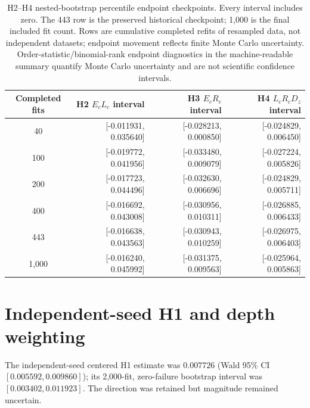 \documentclass[pdflatex,sn-basic,Numbered]{sn-jnl}
\begin{document}
\begin{table}[t]\centering\small
\begin{tabular}{crrr}
\toprule
Completed fits & H2 $E_cL_c$ interval & H3 $E_cR_c$ interval & H4 $L_cR_cD_z$ interval \\
\midrule
40    & [-0.011931, 0.035640] & [-0.028213, 0.000850] & [-0.024829, 0.006450] \\
100   & [-0.019772, 0.041956] & [-0.033480, 0.009079] & [-0.027224, 0.005826] \\
200   & [-0.017723, 0.044496] & [-0.032630, 0.006696] & [-0.024829, 0.005711] \\
400   & [-0.016692, 0.043008] & [-0.030956, 0.010311] & [-0.026885, 0.006433] \\
443   & [-0.016638, 0.043563] & [-0.030943, 0.010259] & [-0.026975, 0.006403] \\
1,000 & [-0.016240, 0.045992] & [-0.031375, 0.009563] & [-0.025964, 0.005863] \\
\bottomrule
\end{tabular}
\caption{H2--H4 nested-bootstrap percentile endpoint checkpoints. Every interval includes zero. The 443 row is the preserved historical checkpoint; 1,000 is the final included fit count. Rows are cumulative completed refits of resampled data, not independent datasets; endpoint movement reflects finite Monte Carlo uncertainty. Order-statistic/binomial-rank endpoint diagnostics in the machine-readable summary quantify Monte Carlo uncertainty and are not scientific confidence intervals.}
\label{supp:tab:bootstrap-checkpoints}
\end{table}

\section{Independent-seed H1 and depth weighting}

The independent-seed centered H1 estimate was $0.007726$ (Wald 95\% CI $[0.005592,0.009860]$); its 2,000-fit, zero-failure bootstrap interval was $[0.003402,0.011923]$. The direction was retained but magnitude remained uncertain.
\end{document}
